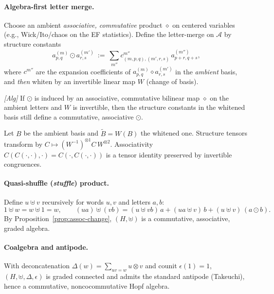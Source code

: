 \paragraph{Algebra-first letter merge.}
Choose an ambient \emph{associative, commutative} product $\diamond$ on centered variables (e.g., Wick/Ito/chaos on the EF statistics). Define the letter-merge on $\mathcal A$ by structure constants
\[
a^{(m)}_{p,q}\odot a^{(m')}_{r,s}\ :=\ \sum_{m''} c^{m''}_{(m,p,q),(m',r,s)}\, a^{(m'')}_{p+r,q+s},
\]
where $c^{m''}$ are the expansion coefficients of $a^{(m)}_{p,q}\diamond a^{(m')}_{r,s}$ in the \emph{ambient} basis, and \emph{then} whiten by an invertible linear map $W$ (change of basis).

\begin{proposition}\label{prop:assoc-change}
\emph{[\textup{Alg}]}
If $\odot$ is induced by an associative, commutative bilinear map $\diamond$ on the ambient letters and $W$ is invertible, then the structure constants in the whitened basis still define a commutative, associative $\odot$.
\begin{proofsketch}
Let $B$ be the ambient basis and $\tilde B=W(B)$ the whitened one. Structure tensors transform by $C\mapsto (W^{-1})^{\otimes 1} C\, W^{\otimes 2}$. Associativity $C(C(\cdot,\cdot),\cdot)=C(\cdot,C(\cdot,\cdot))$ is a tensor identity preserved by invertible congruences.
\end{proofsketch}
\end{proposition}

\paragraph{Quasi-shuffle (\emph{stuffle}) product.}
Define $u\uplus v$ recursively for words $u,v$ and letters $a,b$:
\[
1\uplus w=w\uplus 1=w,\qquad
(ua)\uplus (vb)=(u\uplus vb)\,a+(ua\uplus v)\,b+(u\uplus v)\,(a\odot b).
\]
By Proposition~\ref{prop:assoc-change}, $(H,\uplus)$ is a commutative, associative, graded algebra.

\paragraph{Coalgebra and antipode.}
With deconcatenation $\Delta(w)=\sum_{uv=w}u\otimes v$ and counit $\epsilon(1)=1$, $(H,\uplus,\Delta,\epsilon)$ is graded connected and admits the standard antipode (Takeuchi), hence a commutative, noncocommutative Hopf algebra.

